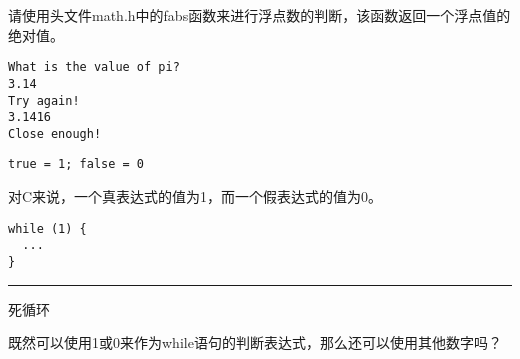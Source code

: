 \begin{frame}[fragile]\ft{\secname}
请使用头文件math.h中的fabs函数来进行浮点数的判断，该函数返回一个浮点值的绝对值。
\end{frame}

\begin{frame}\ft{\secname}

\end{frame}

\begin{frame}[fragile]\ft{\secname}
\begin{lstlisting}[backgroundcolor=\color{red!10}]
What is the value of pi?
3.14
Try again!
3.1416
Close enough!
\end{lstlisting}
\end{frame}

\begin{frame}[fragile]

\pause

\begin{lstlisting}[backgroundcolor=\color{blue!20}]
true = 1; false = 0
\end{lstlisting}
\end{frame}

\begin{frame}[fragile]
对C来说，一个真表达式的值为1，而一个假表达式的值为0。
\end{frame}

\begin{frame}[fragile]

\begin{lstlisting}
while (1) {
  ...
}
\end{lstlisting}
\rule{\textwidth}{1mm}\pause

死循环
\end{frame}

\begin{frame}[fragile]
\begin{wenti}
既然可以使用1或0来作为while语句的判断表达式，那么还可以使用其他数字吗？
\end{wenti}
\end{frame}

\begin{frame}
      
\end{frame}

